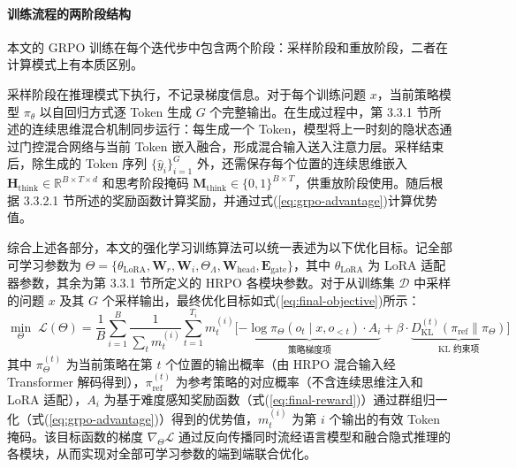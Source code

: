 \paragraph{训练流程的两阶段结构}

本文的 GRPO 训练在每个迭代步中包含两个阶段：采样阶段和重放阶段，二者在计算模式上有本质区别。

采样阶段在推理模式下执行，不记录梯度信息。对于每个训练问题 $x$，当前策略模型 $\pi_\theta$ 以自回归方式逐 Token 生成 $G$ 个完整输出。在生成过程中，第 3.3.1 节所述的连续思维混合机制同步运行：每生成一个 Token，模型将上一时刻的隐状态通过门控混合网络与当前 Token 嵌入融合，形成混合输入送入注意力层。采样结束后，除生成的 Token 序列 $\{\hat{y}_i\}_{i=1}^G$ 外，还需保存每个位置的连续思维嵌入 $\mathbf{H}_{\text{think}} \in \mathbb{R}^{B \times T \times d}$ 和思考阶段掩码 $\mathbf{M}_{\text{think}} \in \{0,1\}^{B \times T}$，供重放阶段使用。随后根据 3.3.2.1 节所述的奖励函数计算奖励，并通过式(\ref{eq:grpo-advantage})计算优势值。


综合上述各部分，本文的强化学习训练算法可以统一表述为以下优化目标。记全部可学习参数为 $\Theta = \{\theta_{\text{LoRA}}, \mathbf{W}_r, \mathbf{W}_i, \Theta_\Lambda, \mathbf{W}_{\text{head}}, \mathbf{E}_{\text{gate}}\}$，其中 $\theta_{\text{LoRA}}$ 为 LoRA 适配器参数，其余为第 3.3.1 节所定义的 HRPO 各模块参数。对于从训练集 $\mathcal{D}$ 中采样的问题 $x$ 及其 $G$ 个采样输出，最终优化目标如式(\ref{eq:final-objective})所示：
\begin{equation}\label{eq:final-objective}
  \min_{\Theta} \; \mathcal{L}(\Theta) = \frac{1}{B} \sum_{i=1}^{B} \frac{1}{\sum_{t} m_t^{(i)}} \sum_{t=1}^{T_i} m_t^{(i)} \Big[ \underbrace{-\log \pi_\Theta(o_t \mid x, o_{<t}) \cdot A_i}_{\text{策略梯度项}} + \beta \cdot \underbrace{D_{\text{KL}}^{(t)}(\pi_{\text{ref}} \| \pi_\Theta)}_{\text{KL 约束项}} \Big]
\end{equation}
其中 $\pi_\Theta^{(t)}$ 为当前策略在第 $t$ 个位置的输出概率（由 HRPO 混合输入经 Transformer 解码得到），$\pi_{\text{ref}}^{(t)}$ 为参考策略的对应概率（不含连续思维注入和 LoRA 适配），$A_i$ 为基于难度感知奖励函数（式(\ref{eq:final-reward})）通过群组归一化（式(\ref{eq:grpo-advantage})）得到的优势值，$m_t^{(i)}$ 为第 $i$ 个输出的有效 Token 掩码。该目标函数的梯度 $\nabla_\Theta \mathcal{L}$ 通过反向传播同时流经语言模型和融合隐式推理的各模块，从而实现对全部可学习参数的端到端联合优化。





